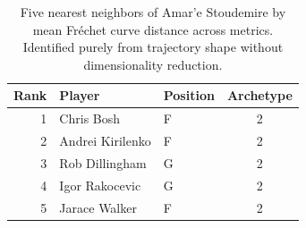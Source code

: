 \begin{table}[htbp]
  \centering\small
  \begin{tabular}{rllc}
    \toprule
    Rank & Player & Position & Archetype \\
    \midrule
    1 & Chris Bosh & F & 2 \\
    2 & Andrei Kirilenko & F & 2 \\
    3 & Rob Dillingham & G & 2 \\
    4 & Igor Rakocevic & G & 2 \\
    5 & Jarace Walker & F & 2 \\
    \bottomrule
  \end{tabular}
  \caption{Five nearest neighbors of Amar'e Stoudemire by mean Fr\'{e}chet curve distance across metrics. Identified purely from trajectory shape without dimensionality reduction.}
  \label{tab:Amar_e_Stoudemire_frechet_curve_neighbors}
\end{table}

